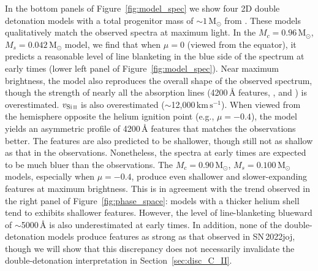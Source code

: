 \documentclass[twocolumn]{aastex631}
\newcommand{\sn}{SN\,2022joj}
\newcommand{\kms}{$\mathrm{km}\,\mathrm{s}^{-1}$}
\begin{document}
\begin{CJK*}{UTF8}{gbsn}
In the bottom panels of Figure~\ref{fig:model_spec} we show four 2D double detonation models with a total progenitor mass of $\sim$$1\,\mathrm{M_\odot}$ from \citet{Shen_2D_2021}. These models qualitatively match the observed spectra at maximum light. In the $M_c=0.96\,\mathrm{M_\odot}$, $M_s=0.042\,\mathrm{M_\odot}$ model, we find that when $\mu=0$ (viewed from the equator), it predicts a reasonable level of line blanketing in the blue side of the spectrum at early times (lower left panel of Figure~\ref{fig:model_spec}). Near maximum brightness, the model also reproduces the overall shape of the observed spectrum, though the strength of nearly all the absorption lines (4200\,\r{A} features, , and ) is overestimated. $v_\mathrm{Si\,\textsc{ii}}$ is also overestimated ($\sim$12,000\,\kms). When viewed from the hemisphere opposite the helium ignition point (e.g., $\mu=-0.4$), the model yields an asymmetric profile of 4200\,\r{A} features that matches the observations better. The  features are also predicted to be shallower, though still not as shallow as that in the observations. Nonetheless, the spectra at early times are expected to be much bluer than the observations. The $M_c=0.90\,\mathrm{M_\odot}$, $M_s=0.100\,\mathrm{M_\odot}$ models, especially when $\mu=-0.4$, produce even shallower and slower-expanding  features at maximum brightness. This is in agreement with the trend observed in the right panel of Figure~\ref{fig:phase_space}: models with a thicker helium shell tend to exhibits shallower  features. However, the level of line-blanketing blueward of $\sim$5000\,\r{A} is also underestimated at early times. In addition, none of the double-detonation models produce  features as strong as that observed in \sn, though we will show that this discrepancy does not necessarily invalidate the double-detonation interpretation in Section~\ref{sec:disc_C_II}.


\end{CJK*}
\end{document}

